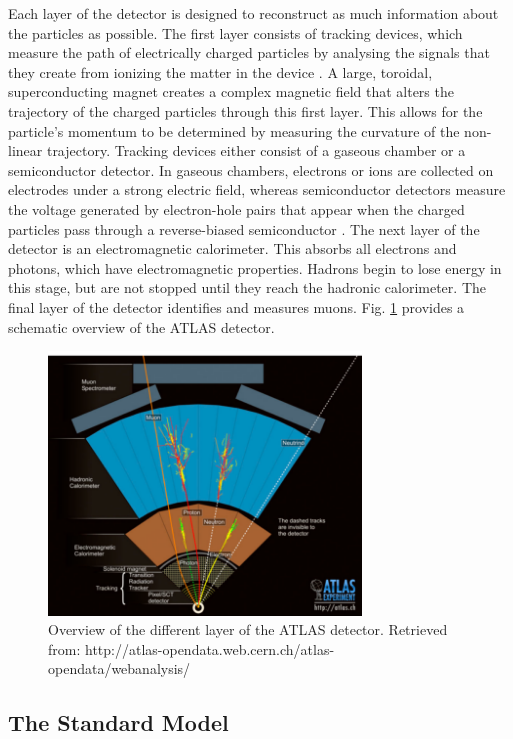 \documentclass[runningheads,a4paper]{llncs}
\begin{document}
Each layer of the detector is designed to reconstruct as much information about the particles as possible. The first layer consists of tracking devices, which measure the path of electrically charged particles by analysing the signals that they create from ionizing the matter in the device \cite{aad2012observation}. A large, toroidal, superconducting magnet creates a complex magnetic field that alters the trajectory of the charged particles through this first layer. This allows for the particle’s momentum to be determined by measuring the curvature of the non-linear trajectory. Tracking devices either consist of a gaseous chamber or a semiconductor detector. In gaseous chambers, electrons or ions are collected on electrodes under a strong electric field, whereas semiconductor detectors measure the voltage generated by electron-hole pairs that appear when the charged particles pass through a reverse-biased semiconductor \cite{aad2012observation}. The next layer of the detector is an electromagnetic calorimeter. This absorbs all electrons and photons, which have electromagnetic properties. Hadrons begin to lose energy in this stage, but are not stopped until they reach the hadronic calorimeter. The final layer of the detector identifies and measures muons. Fig. \ref{fig:atlas} provides a schematic overview of the ATLAS detector.\\
\begin{figure}
\centering
\includegraphics[height=7cm]{atlas}
\caption{Overview of the different layer of the ATLAS detector. Retrieved from:
http://atlas-opendata.web.cern.ch/atlas-opendata/webanalysis/}
\label{fig:atlas}
\end{figure}
\pagebreak
\subsection{The Standard Model}
\end{document}
